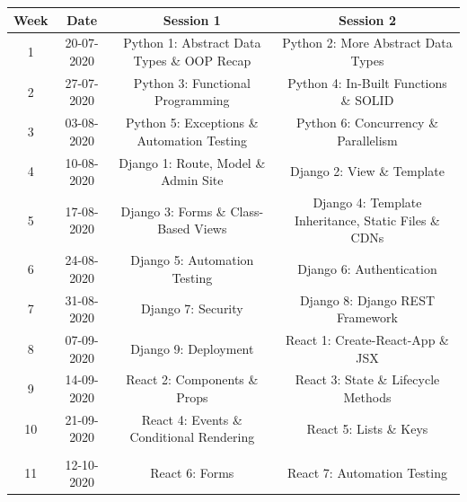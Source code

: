 \documentclass{article}
\begin{document}
\renewcommand{\arraystretch}{1.5}
\begin{tabular}{|c|c|c|c|}
	\hline
	\textbf{Week} & \textbf{Date}     & \textbf{Session 1}                                     & \textbf{Session 2}                                          \\ \hline
	\small 1      & \small 20-07-2020 & \small Python 1: Abstract Data Types \& OOP Recap      & \small Python 2: More Abstract Data Types                   \\ \hline
	\small 2      & \small 27-07-2020 & \small Python 3: Functional Programming                & \small Python 4: In-Built Functions \& SOLID                \\ \hline
	\small 3      & \small 03-08-2020 & \small Python 5: Exceptions \& Automation Testing      & \small Python 6: Concurrency \& Parallelism                 \\ \hline
	\small 4      & \small 10-08-2020 & \small Django 1: Route, Model \& Admin Site            & \small Django 2: View \& Template                           \\ \hline
	\small 5      & \small 17-08-2020 & \small Django 3: Forms \& Class-Based Views            & \small Django 4: Template Inheritance, Static Files \& CDNs \\ \hline
	\small 6      & \small 24-08-2020 & \small Django 5: Automation Testing                    & \small Django 6: Authentication                             \\ \hline
	\small 7      & \small 31-08-2020 & \small Django 7: Security                              & \small Django 8: Django REST Framework                      \\ \hline
	\small 8      & \small 07-09-2020 & \small Django 9: Deployment                            & \small React 1: Create-React-App \& JSX                     \\ \hline
	\small 9      & \small 14-09-2020 & \small React 2: Components \& Props        & \small React 3: State \& Lifecycle Methods                  \\ \hline
	\small 10     & \small 21-09-2020 & \small React 4: Events \& Conditional Rendering & \small React 5:  Lists \& Keys                              \\ \hline
	\rowcolor{yellow} \multicolumn{4}{|c|}{\small Mid Term Break}                                                             \\ \hline
	\small 11     & \small 12-10-2020 & \small React 6: Forms          & \small React 7: Automation Testing       \\ \hline                                           

\end{tabular}
\end{document}

